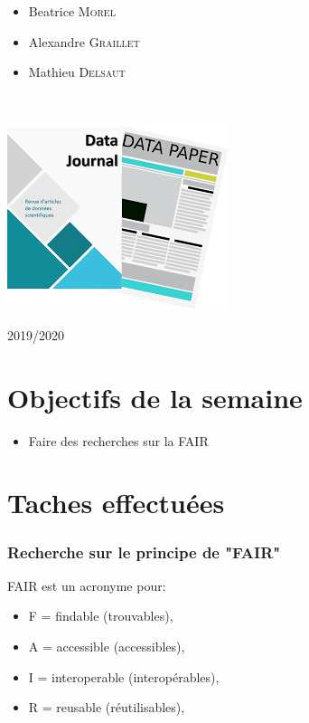\documentclass[14pt,oneside]{article}
\begin{document}
\begin{titlepage}
\begin{minipage}{0.45\textwidth}
\begin{flushright}
\begin{itemize}[font=\color{amber} \Large, label=, leftmargin=3.5cm]
\item{Beatrice \textsc{Morel}}
\item{Alexandre \textsc{Graillet}}
\item{Mathieu \textsc{Delsaut}}
\end{itemize}

\end{flushright}
\end{minipage}\\[0cm]
\vspace{2 cm}
\begin{center}
\includegraphics[scale=1]{1.png} 
\end{center}
\vspace{1cm}

\begin{center}
2019/2020
\end{center}
\vfill
\end{titlepage}


\newpage
\part*{Objectifs de la semaine}
\begin{itemize}
	\item Faire des recherches sur la FAIR
\end{itemize}

\part*{Taches effectuées}
\section*{Recherche sur le principe de "FAIR"}

\noindent FAIR est un acronyme pour:
\begin{itemize}
    \item F = findable (trouvables),
    \item A = accessible (accessibles),
    \item I = interoperable (interopérables),
    \item R = reusable (réutilisables),
\end{itemize}
\end{document}
